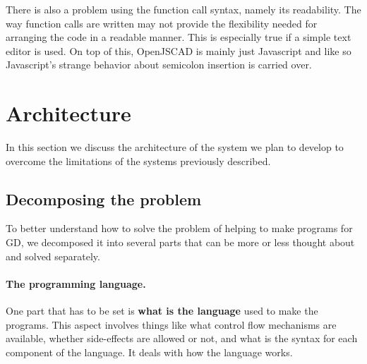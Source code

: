 \documentclass{./llncs2e/llncs}
\begin{document}
	There is also a problem using the function call syntax, namely its readability.
	The way function calls are written may not provide the flexibility needed for arranging the code in a readable manner. 
	This is especially true if a simple text editor is used. 
	On top of this, OpenJSCAD is mainly just Javascript and like so Javascript's strange behavior about semicolon insertion is carried over. 




\section{Architecture}
	In this section we discuss the architecture of the system we plan to develop to overcome the limitations of the systems previously described.

\subsection{Decomposing the problem}
	To better understand how to solve the problem of helping to make programs for GD, we decomposed it into several parts that can be more or less thought about and solved separately.
	
	\paragraph{The programming language.}
	One part that has to be set is \textbf{what is the language} used to make the programs.
	This aspect involves things like what control flow mechanisms are available, whether side-effects are allowed or not, and what is the syntax for each component of the language.
	It deals with how the language works.
\end{document}
